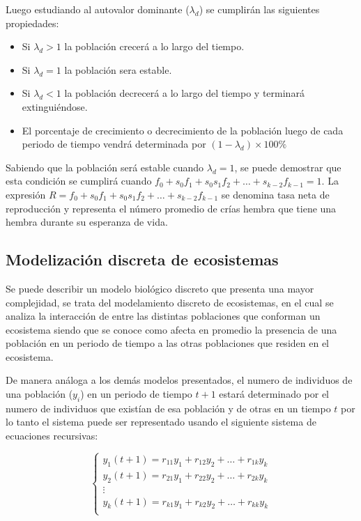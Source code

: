 Luego estudiando al autovalor dominante ($\lambda_d$) se cumplirán las siguientes propiedades:

\begin{itemize}
	\item Si $\lambda_{d}> 1$ la población crecerá a lo largo del tiempo.
	\item Si $\lambda_{d} = 1$ la población sera estable.
	\item Si $\lambda_{d}< 1$ la población decrecerá a lo largo del tiempo y terminará extinguiéndose.
    \item El porcentaje de crecimiento o decrecimiento de la población  luego de cada  periodo de tiempo vendrá determinada por $(1-\lambda_d) \times 100\% $
\end{itemize}

Sabiendo que la población será estable cuando $\lambda_d = 1$, se puede demostrar que esta condición se cumplirá cuando $f_0+s_0f_1+s_0s_1f_2+\dots+s_{k-2}f_{k-1} = 1$. La expresión $R = f_0+s_0f_1+s_0s_1f_2+\dots+s_{k-2}f_{k-1}$ se denomina tasa neta de reproducción y representa el número promedio de crías hembra que tiene una hembra durante su esperanza de vida. 

\subsection{Modelización discreta de ecosistemas}

Se puede describir un modelo biológico discreto que presenta una mayor complejidad, se trata del modelamiento discreto de ecosistemas, en el cual se analiza la interacción de entre las distintas poblaciones que conforman un ecosistema siendo que se conoce como afecta en promedio la presencia de una población en un periodo de tiempo a las otras poblaciones que residen en el ecosistema.

De manera análoga a los demás modelos presentados, el numero de individuos de una población ($y_i$) en un periodo de tiempo $t+1$ estará determinado por el numero de individuos que existían de esa población y de otras en un tiempo $t$ por lo tanto el sistema puede ser representado usando el siguiente sistema de ecuaciones recursivas:

\[
	\begin{cases}
	 y_{1}(t+1) = r_{11}y_{1} + r_{12}y_{2} + \dots + r_{1k}y_{k}\\
	 y_{2}(t+1) = r_{21}y_{1} + r_{22}y_{2} + \dots + r_{2k}y_{k}\\
	 \vdots\\
	 y_{k}(t+1) = r_{k1}y_{1} + r_{k2}y_{2} + \dots + r_{kk}y_{k}\\
	\end{cases}
\]

